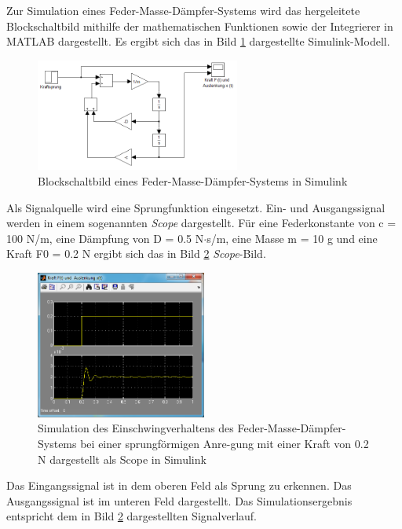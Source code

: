 \noindent Zur Simulation eines Feder-Masse-Dämpfer-Systems wird das hergeleitete Blockschaltbild mithilfe der
mathematischen Funktionen sowie der Integrierer in MATLAB dargestellt. Es ergibt sich das in Bild \ref{fig:FMDinSimulink} dargestellte Simulink-Modell.

\begin{figure}[H]
  \centerline{\includegraphics[width=0.6\textwidth]{Kapitel2/Bilder/image36}}
  \caption{Blockschaltbild eines Feder-Masse-Dämpfer-Systems in Simulink }
  \label{fig:FMDinSimulink}
\end{figure}

\noindent Als Signalquelle wird eine Sprungfunktion eingesetzt. Ein- und Ausgangssignal werden in einem sogenannten \textit{Scope}  dargestellt. Für eine Federkonstante von c = 100 N/m, eine Dämpfung von D = 0.5 N$\cdot$s/m, eine Masse m = 10 g und eine Kraft F0 = 0.2 N ergibt sich das in Bild \ref{fig:SimulationFDM} \textit{Scope}-Bild.

\begin{figure}[H]
  \centerline{\includegraphics[width=0.5\textwidth]{Kapitel2/Bilder/image37}}
  \caption{Simulation des Einschwingverhaltens des Feder-Masse-Dämpfer-Systems bei einer sprungförmigen Anre-gung mit einer Kraft von 0.2 N dargestellt als Scope in Simulink}
  \label{fig:SimulationFDM}
\end{figure}

\noindent Das Eingangssignal ist in dem oberen Feld als Sprung zu erkennen. Das Ausgangssignal ist im unteren Feld dargestellt. Das Simulationsergebnis entspricht dem in Bild \ref{fig:SimulationFDM} dargestellten Signalverlauf.

